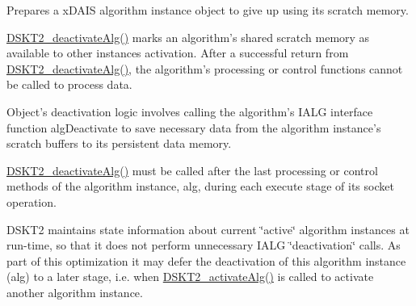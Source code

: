 Prepares a x\-DAIS algorithm instance object to give up using its scratch memory. 

\hyperlink{group___d_s_p_d_s_k_t2_g74b6b6feca63328906acade37d23b597}{DSKT2\_\-deactivate\-Alg()} marks an algorithm's shared scratch memory as available to other instances activation. After a successful return from \hyperlink{group___d_s_p_d_s_k_t2_g74b6b6feca63328906acade37d23b597}{DSKT2\_\-deactivate\-Alg()}, the algorithm's processing or control functions cannot be called to process data.

Object's deactivation logic involves calling the algorithm's IALG interface function alg\-Deactivate to save necessary data from the algorithm instance's scratch buffers to its persistent data memory.

\hyperlink{group___d_s_p_d_s_k_t2_g74b6b6feca63328906acade37d23b597}{DSKT2\_\-deactivate\-Alg()} must be called after the last processing or control methods of the algorithm instance, alg, during each execute stage of its socket operation.

DSKT2 maintains state information about current \char`\"{}active\char`\"{} algorithm instances at run-time, so that it does not perform unnecessary IALG \char`\"{}deactivation\char`\"{} calls. As part of this optimization it may defer the deactivation of this algorithm instance (alg) to a later stage, i.e. when \hyperlink{group___d_s_p_d_s_k_t2_gf946d426d6d9a95040d3967fa746cd7a}{DSKT2\_\-activate\-Alg()} is called to activate another algorithm instance.


